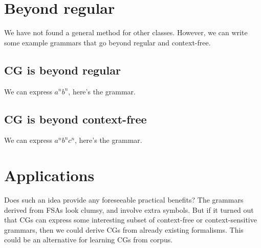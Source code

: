 \documentclass[11pt]{article}
\def\t#1{\texttt{#1}}
\begin{document}






\section{Beyond regular}

We have not found a general method for other classes. 
However, we can write some example grammars that go beyond regular and context-free.

\subsection{CG is beyond regular}

We can express $a^nb^n$, here's the grammar.

\subsection{CG is beyond context-free}

We can express $a^nb^nc^n$, here's the grammar.  

\section{Applications}

Does such an idea provide any foreseeable practical benefits?
The grammars derived from FSAs look clumsy, and involve extra symbols.
But if it turned out that CGs can express some interesting subset of context-free 
or context-sensitive grammars, then we could derive CGs from already existing formalisms.
This could be an alternative for learning CGs from corpus.
\end{document}
